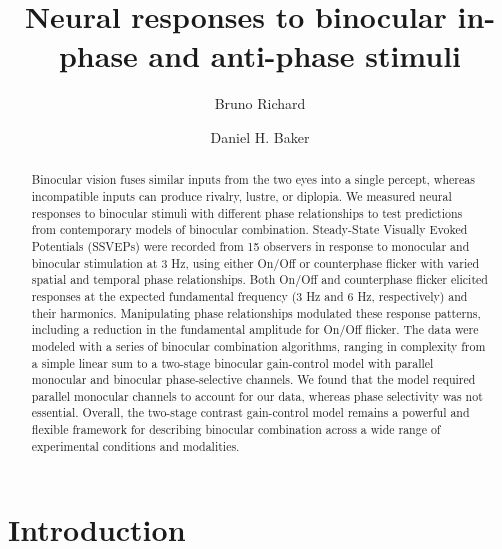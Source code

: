 \documentclass[
  12pt,
]{article}
\title{Neural responses to binocular in-phase and anti-phase stimuli}
\author[1]{Bruno Richard}
\author[2]{Daniel H. Baker}
\affil[1]{Department of Math and Computer Sciences, Rutgers
University, Newark, New Jersey, USA}
\affil[2]{Department of Psychology, University of York, York, UK}
\date{}
\begin{document}
\maketitle
\begin{abstract}
Binocular vision fuses similar inputs from the two eyes into a single
percept, whereas incompatible inputs can produce rivalry, lustre, or
diplopia. We measured neural responses to binocular stimuli with
different phase relationships to test predictions from contemporary
models of binocular combination. Steady-State Visually Evoked Potentials
(SSVEPs) were recorded from 15 observers in response to monocular and
binocular stimulation at 3 Hz, using either On/Off or counterphase
flicker with varied spatial and temporal phase relationships. Both
On/Off and counterphase flicker elicited responses at the expected
fundamental frequency (3 Hz and 6 Hz, respectively) and their harmonics.
Manipulating phase relationships modulated these response patterns,
including a reduction in the fundamental amplitude for On/Off flicker.
The data were modeled with a series of binocular combination algorithms,
ranging in complexity from a simple linear sum to a two-stage binocular
gain-control model with parallel monocular and binocular phase-selective
channels. We found that the model required parallel monocular channels
to account for our data, whereas phase selectivity was not essential.
Overall, the two-stage contrast gain-control model remains a powerful
and flexible framework for describing binocular combination across a
wide range of experimental conditions and modalities.
\end{abstract}


\section{Introduction}\label{introduction}
\end{document}

